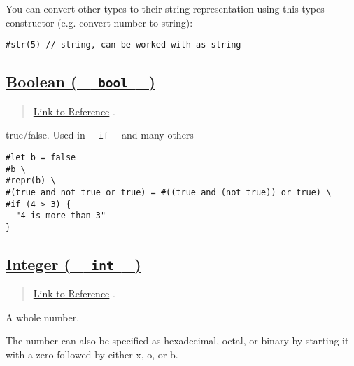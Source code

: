 \pandocbounded{}

You can convert other types to their string representation using this
type\textquotesingle s constructor (e.g. convert number to string):

\begin{verbatim}
#str(5) // string, can be worked with as string
\end{verbatim}

\pandocbounded{}

\subsection{\texorpdfstring{\hyperref[boolean-bool]{Boolean (
\texttt{\ }{\texttt{\ bool\ }}\texttt{\ }
)}}{Boolean (   bool   )}}\label{boolean-bool}

\begin{quote}
\href{https://typst.app/docs/reference/foundations/bool/}{Link to
Reference} .
\end{quote}

true/false. Used in \texttt{\ }{\texttt{\ if\ }}\texttt{\ } and many
others

\begin{verbatim}
#let b = false
#b \
#repr(b) \
#(true and not true or true) = #((true and (not true)) or true) \
#if (4 > 3) {
  "4 is more than 3"
}
\end{verbatim}

\pandocbounded{}

\subsection{\texorpdfstring{\hyperref[integer-int]{Integer (
\texttt{\ }{\texttt{\ int\ }}\texttt{\ }
)}}{Integer (   int   )}}\label{integer-int}

\begin{quote}
\href{https://typst.app/docs/reference/foundations/int/}{Link to
Reference} .
\end{quote}

A whole number.

The number can also be specified as hexadecimal, octal, or binary by
starting it with a zero followed by either x, o, or b.

